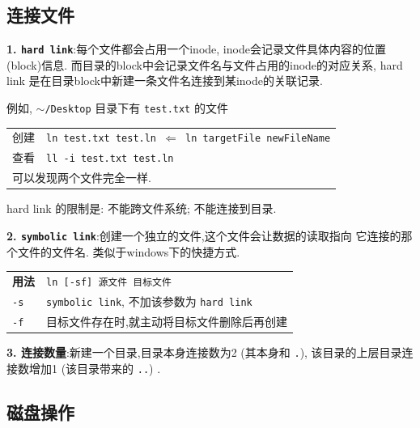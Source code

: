 \subsection{连接文件}
\par
\textbf{1. \texttt{hard link}}:每个文件都会占用一个inode, inode会记录文件具体内容的位置(block)信息. 而目录的block中会记录文件名与文件占用的inode的对应关系, hard link 是在目录block中新建一条文件名连接到某inode的关联记录.
\par
例如, \texttt{$\sim$/Desktop} 目录下有 \texttt{test.txt} 的文件
\begin{longtable}{l@{ : }p{}}\hline\hline
创建 & \texttt{ln test.txt test.ln  $\Leftarrow$ ln targetFile newFileName}\\

查看 & \texttt{ll -i test.txt test.ln}\\

\multicolumn{2}{l}{可以发现两个文件完全一样.}\\
\hline
\end{longtable}
hard link 的限制是: 不能跨文件系统; 不能连接到目录.

\par
\textbf{2. \texttt{symbolic link}}:创建一个独立的文件,这个文件会让数据的读取指向%
它连接的那个文件的文件名. 类似于windows下的快捷方式.
\begin{longtable}{l@{ : }p{}}\hline\hline
\textbf{用法} & \verb"ln [-sf] 源文件 目标文件"
    \\

    \texttt{-s} & \texttt{symbolic link}, 不加该参数为 \texttt{hard link}\\

    \texttt{-f} & 目标文件存在时,就主动将目标文件删除后再创建\\
\hline
\end{longtable}

\par
\textbf{3. 连接数量}:新建一个目录,目录本身连接数为2 (其本身和 \verb"."), 该目录的上层目录连接数增加1 (该目录带来的 \verb"..") .

\subsection{磁盘操作}
